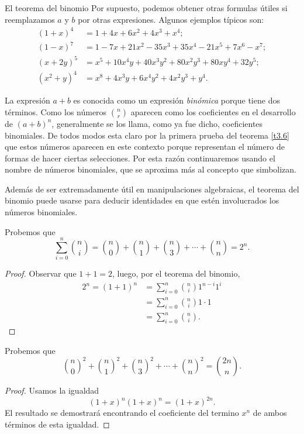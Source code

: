 \begin{section}{El teorema del binomio}
Por supuesto, podemos obtener otras formulas útiles si
reemplazamos $a$ y $b$ por otras expresiones. Algunos ejemplos
típicos son:
$$\begin{aligned}
(1+x)^4 &= 1 + 4x + 6x^2+ 4x^3+ x^4;\\
(1-x)^7 &= 1 -7x + 21x^2- 35x^3+ 35x^4- 21x^5+ 7x^6 -x^7;\\
(x+2y)^5 &= x^5 + 10 x^4 y + 40 x^3 y^2+80 x^2 y^3+80 x y^4+32 y^5; \\
(x^2+y)^4 &= x^8 +4 x^3 y +6 x^4 y^2 +4 x^2 y^3 + y^4.
\end{aligned}
$$




La expresión $a+b$ es conocida como un expresión {\it binómica}
porque tiene dos términos. Como los números   $\binom{n}{r}$ aparecen como los coeficientes en el
desarrollo de $(a+b)^n$, generalmente se los llama, como ya fue dicho, 
coeficientes binomiales.  
De todos modos esta claro por la primera prueba del teorema \ref{t3.6} que
estos números aparecen en este contexto porque representan el
número de formas de hacer ciertas selecciones. Por esta razón
continuaremos usando el nombre de números binomiales,
 que se aproxima más al concepto que
simbolizan.

Además de ser extremadamente útil en manipulaciones algebraicas,
el teorema del binomio puede usarse para deducir identidades en
que estén involucrados los números binomiales.

\begin{ejemplo} Probemos que 
	\begin{equation*}
	\sum_{i=0}^{n}\binom{n}{i} = \binom{n}{0}+\binom{n}{1}+\binom{n}{3}+\cdots+\binom{n}{n}= 2^n.
	\end{equation*}
\end{ejemplo}
\begin{proof}
	Observar  que $1 + 1 = 2$, luego, por el teorema del binomio,
	\begin{align*}
		2^n = (1 +1)^n 
		    &= \sum_{i=0}^{n} \binom{n}{i}1^{n-i}1^i \\
		    &= \sum_{i=0}^{n} \binom{n}{i}1 \cdot 1 \\
		    &= \sum_{i=0}^{n} \binom{n}{i}.
	\end{align*} 
\end{proof}

\begin{ejemplo}Probemos que
\begin{equation}\label{eqcuaddo}
\binom{n}{0}^2+\binom{n}{1}^2+\binom{n}{3}^2+\cdots+\binom{n}{n}^2=
\binom{2n}{n}.
\end{equation}
\end{ejemplo}
\begin{proof}
Usamos la igualdad
\begin{equation*}\label{eqxn}
(1+x)^n(1+x)^n=(1+x)^{2n}.
\end{equation*}
El resultado se demostrará encontrando el coeficiente del termino $x^n$ de ambos términos de esta igualdad.


\end{proof}
\end{section}
